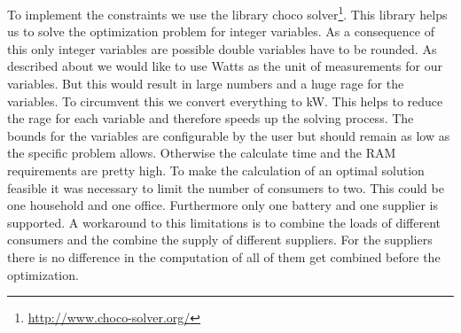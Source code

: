 To implement the constraints we use the library choco solver\footnote{\url{http://www.choco-solver.org/}}. This library helps us to solve the optimization problem for integer variables. As a consequence of this only integer variables are possible double variables have to be rounded. As described about we would like to use Watts as the unit of measurements for our variables. But this would result in large numbers and a huge rage for the variables. To circumvent this we convert everything to kW. This helps to reduce the rage for each variable and therefore speeds up the solving process. The bounds for the variables are configurable by the user but should remain as low as the specific problem allows. Otherwise the calculate time and the RAM requirements are pretty high. To make the calculation of an optimal solution feasible it was necessary to limit the number of consumers to two. This could be one household and one office. Furthermore only one battery and one supplier is supported. A workaround to this limitations is to combine the loads of different consumers and the combine the supply of different suppliers. For the suppliers there is no difference in the computation of all of them get combined before the optimization.